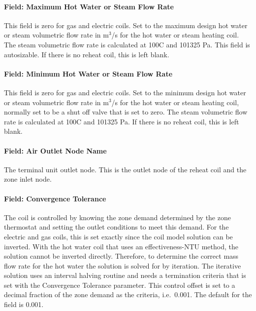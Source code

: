 \paragraph{Field: Maximum Hot Water or Steam Flow Rate}\label{field-maximum-hot-water-or-steam-flow-rate-1}

This field is zero for gas and electric coils. Set to the maximum design hot water or steam volumetric flow rate in m\(^{3}\)/s for the hot water or steam heating coil. The steam volumetric flow rate is calculated at 100C and 101325 Pa. This field is autosizable. If there is no reheat coil, this is left blank.

\paragraph{Field: Minimum Hot Water or Steam Flow Rate}\label{field-minimum-hot-water-or-steam-flow-rate-1}

This field is zero for gas and electric coils. Set to the minimum design hot water or steam volumetric flow rate in m\(^{3}\)/s for the hot water or steam heating coil, normally set to be a shut off valve that is set to zero. The steam volumetric flow rate is calculated at 100C and 101325 Pa. If there is no reheat coil, this is left blank.

\paragraph{Field: Air Outlet Node Name}\label{field-air-outlet-node-name-1}

The terminal unit outlet node. This is the outlet node of the reheat coil and the zone inlet node.

\paragraph{Field: Convergence Tolerance}\label{field-convergence-tolerance-1}

The coil is controlled by knowing the zone demand determined by the zone thermostat and setting the outlet conditions to meet this demand. For the electric and gas coils, this is set exactly since the coil model solution can be inverted. With the hot water coil that uses an effectiveness-NTU method, the solution cannot be inverted directly. Therefore, to determine the correct mass flow rate for the hot water the solution is solved for by iteration. The iterative solution uses an interval halving routine and needs a termination criteria that is set with the Convergence Tolerance parameter. This control offset is set to a decimal fraction of the zone demand as the criteria, i.e.~0.001. The default for the field is 0.001.

